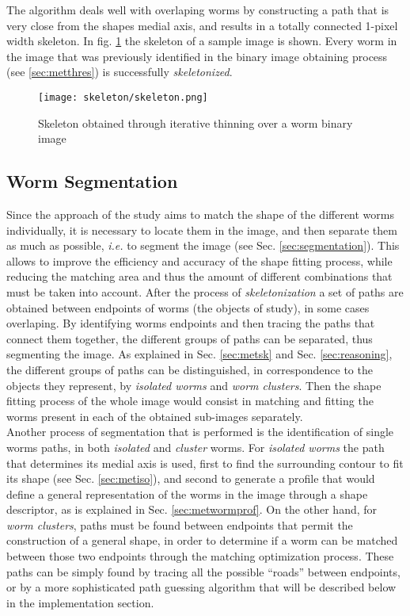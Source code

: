 The algorithm deals well with overlaping worms by constructing a path that is very close
from the shapes medial axis, and results in a totally connected 1-pixel width skeleton.
In fig. \ref{fig:skeleton} the skeleton of a sample image is shown. Every worm in the 
image that was previously identified in the binary image obtaining process 
(see \ref{sec:metthres}) is successfully \emph{skeletonized}.

\begin{figure}[h t b p ! H]
 \centering
   \texttt{[image: skeleton/skeleton.png]}
 \caption{Skeleton obtained through iterative thinning over a worm binary image}
\label{fig:skeleton}
\end{figure} 


\subsection{Worm Segmentation}
\label{sec:metsegmentation}

Since the approach of the study aims to match the shape of the different worms
individually, it is necessary to locate them in the image, and then separate them 
as much as possible, \emph{i.e.} to segment the image (see Sec. \ref{sec:segmentation}). 
This allows to improve the efficiency and accuracy of the 
shape fitting process, while reducing the matching area and thus the amount of 
different combinations that must be taken into account. After the process of 
\emph{skeletonization} a set of paths are obtained 
between endpoints of worms (the objects of study), in some cases overlaping. 
By identifying worms endpoints and then tracing the paths that connect them together,
the different groups of paths can be separated, thus segmenting the image.
As explained in Sec. \ref{sec:metsk} and Sec. \ref{sec:reasoning}, the different groups
of paths can be distinguished, in correspondence to the objects they represent,
by \emph{isolated worms} and \emph{worm clusters}. Then the shape fitting process
of the whole image would consist in matching and fitting the worms present in each of
the obtained sub-images separately.\\

Another process of segmentation that is performed is the identification of single
worms paths, in both \emph{isolated} and \emph{cluster} worms. For \emph{isolated worms}
the path that determines its medial axis is used, first to find the surrounding contour to
fit its shape (see Sec. \ref{sec:metiso}), and second to generate a profile that 
would define a general representation of the worms in the image through a shape
descriptor, as is explained in Sec. \ref{sec:metwormprof}.
On the other hand, for \emph{worm clusters}, paths must be found between endpoints that
permit the construction of a general shape, in order to determine if a worm can be matched
between those two endpoints through the matching optimization process. These paths can
be simply found by tracing all the possible ``roads'' between endpoints, or by
a more sophisticated path guessing algorithm that will be described below in the
implementation section.



